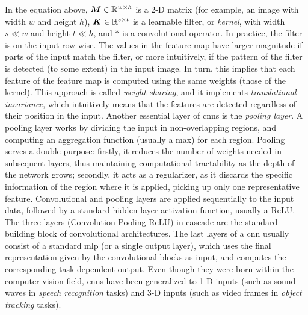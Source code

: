 In the equation above, $\Matrix{M} \in \Real^{w \times h}$ is a 2-D matrix (for example, an image with width $w$ and height $h$), $\Matrix{K} \in \Real^{s \times t}$ is a learnable filter, or \emph{kernel}, with width $s \ll w$ and height $t \ll h$, and $*$ is a convolutional operator. In practice, the filter is  on the input row-wise. The values in the feature map have larger magnitude if parts of the input match the filter, or more intuitively, if the pattern of the filter is detected (to some extent) in the input image. In turn, this implies that each feature of the feature map is computed using the same weights (those of the kernel). This approach is called \emph{weight sharing}, and it implements \emph{translational invariance}, which intuitively means that the features are detected regardless of their position in the input. Another essential layer of \glspl{cnn} is the \emph{pooling layer}. A pooling layer works by dividing the input in non-overlapping regions, and computing an aggregation function (usually a max) for each region. Pooling serves a double purpose: firstly, it reduces the number of weights needed in subsequent layers, thus maintaining computational tractability as the depth of the network grows; secondly, it acts as a regularizer, as it discards the specific information of the region where it is applied, picking up only one representative feature. Convolutional and pooling layers are applied sequentially to the input data, followed by a standard hidden layer activation function, usually a ReLU. The three layers (Convolution-Pooling-ReLU) in cascade are the standard building block of convolutional architectures. The last layers of a \gls{cnn} usually consist of a standard \gls{mlp} (or a single output layer), which uses the final representation given by the convolutional blocks as input, and computes the corresponding task-dependent output. Even though they were born within the computer vision field, \glspl{cnn} have been generalized to 1-D inputs (such as sound waves in \emph{speech recognition} tasks) and 3-D inputs (such as video frames in \emph{object tracking} tasks).


